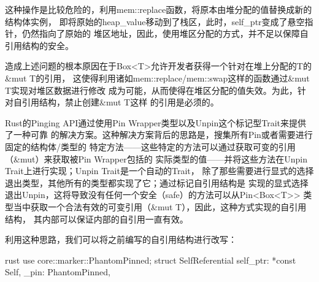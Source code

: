 \begin{warn}
这种操作是比较危险的，利用mem::replace函数，将原本由堆分配的值替换成新的结构体实例，
即将原始的heap\_value移动到了栈区，此时，self\_ptr变成了悬空指针，仍然指向了原始的
堆区地址，因此，使用堆区分配的方式，并不足以保障自引用结构的安全。
\end{warn}

造成上述问题的根本原因在于Box<T>允许开发者获得一个针对在堆上分配的T的\&mut T的引用，
这使得利用诸如mem::replace/mem::swap这样的函数通过\&mut T实现对堆区数据进行修改
成为可能，从而使得在堆区分配的值失效。为此，针对自引用结构，禁止创建\&mut T这样
的引用是必须的。

Rust的Pinging API通过使用Pin Wrapper类型以及Unpin这个标记型Trait来提供了一种可靠
的解决方案。这种解决方案背后的思路是，搜集所有Pin或者需要进行固定的结构体/类型的
特定方法——这些特定的方法可以通过获取可变的引用（\&mut）来获取被Pin Wrapper包括的
实际类型的值——并将这些方法在Unpin Trait上进行实现；Unpin Trait是一个自动的Trait，
除了那些需要进行显式的选择退出类型，其他所有的类型都实现了它；通过标记自引用结构是
实现的显式选择退出Unpin，这将导致没有任何一个安全（safe）的方法可以从Pin<Box<T>>
类型当中获取一个合法有效的可变引用（\&mut T），因此，这种方式实现的自引用结构，
其内部可以保证内部的自引用一直有效。

利用这种思路，我们可以将之前编写的自引用结构进行改写：
\begin{code-block}{rust}
use core::marker::PhantomPinned;
struct SelfReferential {
    self_ptr: *const Self,
    _pin: PhantomPinned,
}
\end{code-block}


